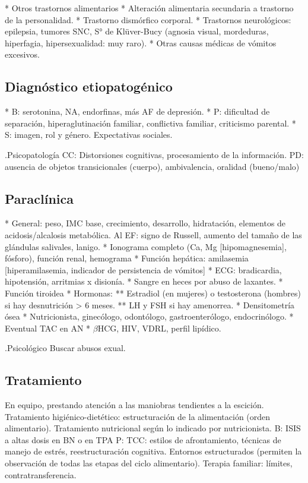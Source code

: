 \documentclass{scrbook}
\begin{document}
* Otros trastornos alimentarios
* Alteración alimentaria secundaria a trastorno de la personalidad.
* Trastorno dismórfico corporal.
* Trastornos neurológicos: epilepsia, tumores SNC, S° de Klüver-Bucy (agnosia visual, mordeduras, hiperfagia, hipersexualidad: muy raro).
* Otras causas médicas de vómitos excesivos.

\subsection*{Diagnóstico etiopatogénico}
* B: serotonina, NA, endorfinas, más AF de depresión.
* P: dificultad de separación, hiperaglutinación familiar, conflictiva familiar, criticismo parental.
* S: imagen, rol y género. Expectativas sociales.

.Psicopatología
CC: Distorsiones cognitivas, procesamiento de la información.
PD: ausencia de objetos transicionales (cuerpo), ambivalencia, oralidad (bueno/malo)

\subsection*{Paraclínica}
* General: peso, IMC base, crecimiento, desarrollo, hidratación, elementos de acidosis/alcalosis metabólica. Al EF: signo de Russell, aumento del tamaño de las glándulas salivales, lanigo.
* Ionograma completo (Ca, Mg [hipomagnesemia], fósforo), función renal, hemograma
* Función hepática: amilasemia [hiperamilasemia, indicador de persistencia de vómitos]
* ECG: bradicardia, hipotensión, arritmias x disionía.
* Sangre en heces por abuso de laxantes.
* Función tiroidea
* Hormonas:
** Estradiol (en mujeres) o testosterona (hombres) si hay desnutrición > 6 meses.
** LH y FSH si hay amenorrea.
* Densitometría ósea
* Nutricionista, ginecólogo, odontólogo, gastroenterólogo, endocrinólogo.
* Eventual TAC en AN
* $\beta$HCG, HIV, VDRL, perfil lipídico.

.Psicológico
Buscar abusos exual.

\subsection*{Tratamiento}
En equipo, prestando atención a las maniobras tendientes a la escición.
Tratamiento higiénico-dietético: estructuración de la alimentación (orden alimentario).
Tratamiento nutricional según lo indicado por nutricionista.
B: ISIS a altas dosis en BN o en TPA
P: TCC: estilos de afrontamiento, técnicas de manejo de estrés, reestructuración cognitiva. Entornos estructurados (permiten la observación de todas las etapas del ciclo alimentario). Terapia familiar: límites, contratransferencia.
\end{document}
